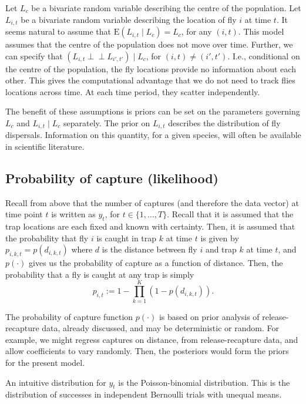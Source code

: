 \documentclass[
  oneside]{book}
\begin{document}
Let \(L_c\) be a bivariate random variable describing the centre of the population. Let \(L_{i, t}\) be a bivariate random variable describing the location of fly \(i\) at time \(t\). It seems natural to assume that \(\mathrm E (L_{i, t} \mid L_c) = L_c\), for any \((i, t)\). This model assumes that the centre of the population does not move over time. Further, we can specify that \((L_{i, t} \perp \!\!\! \perp L_{i', t'}) \mid L_c\), for \((i, t) \neq (i', t')\). I.e., conditional on the centre of the population, the fly locations provide no information about each other. This gives the computational advantage that we do not need to track flies locations across time. At each time period, they scatter independently.

The benefit of these assumptions is priors can be set on the parameters governing \(L_c\) and \(L_{i, t} \mid L_c\) separately. The prior on \(L_{i, t}\) describes the distribution of fly dispersals. Information on this quantity, for a given species, will often be available in scientific literature.

\hypertarget{probability-of-capture-likelihood}{%
\subsection{Probability of capture (likelihood)}\label{probability-of-capture-likelihood}}

Recall from above that the number of captures (and therefore the data vector) at time point \(t\) is written as \(y_t\), for \(t \in \{1, \ldots, T\}\). Recall that it is assumed that the trap locations are each fixed and known with certainty. Then, it is assumed that the probability that fly \(i\) is caught in trap \(k\) at time \(t\) is given by \(p_{i, k, t} = p(d_{i, k, t})\) where \(d\) is the distance between fly \(i\) and trap \(k\) at time \(t\), and \(p(\cdot)\) gives us the probability of capture as a function of distance. Then, the probability that a fly is caught at any trap is simply
\[
p_{i, t} := 1 - \prod_{k=1}^K(1 - p(d_{i, k, t})).
\]

The probability of capture function \(p(\cdot)\) is based on prior analysis of release-recapture data, already discussed, and may be deterministic or random. For example, we might regress captures on distance, from release-recapture data, and allow coefficients to vary randomly. Then, the posteriors would form the priors for the present model.

An intuitive distribution for \(y_t\) is the Poisson-binomial distribution. This is the distribution of successes in independent Bernoulli trials with unequal means.
\end{document}
